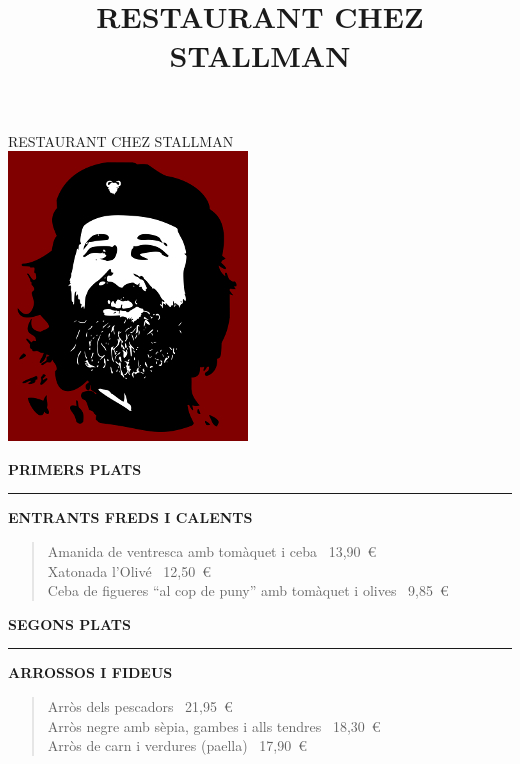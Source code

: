\documentclass[a4paper,oneside]{article}
\title{RESTAURANT CHEZ STALLMAN}
\date{}
\begin{document}
\begin{center}
RESTAURANT CHEZ STALLMAN \\
\bigskip
\includegraphics[scale=0.5]{logo_restaurant.jpg}
\end{center}
\small
{} 
\begin{center}
\textbf{ PRIMERS PLATS}
\end{center}
\hrule
\bigskip
\textbf{ ENTRANTS FREDS I CALENTS}
\begin{quote}
Amanida de ventresca amb tomàquet i ceba \dotfill \ 13,90\ \euro \\
Xatonada l’Olivé \dotfill \ 12,50\ \euro \\
Ceba de figueres “al cop de puny” amb tomàquet i olives \dotfill \ 9,85\ \euro \\
\end{quote}
\begin{center}
\textbf{ SEGONS PLATS}
\end{center}
\hrule
\bigskip
\textbf{ARROSSOS I FIDEUS}
\begin{quote}
Arròs dels pescadors \dotfill \ 21,95\ \euro \\
Arròs negre amb sèpia, gambes i alls tendres \dotfill \ 18,30\ \euro \\
Arròs de carn i verdures (paella) \dotfill \ 17,90\ \euro \\
	\end{quote}
\end{document}
